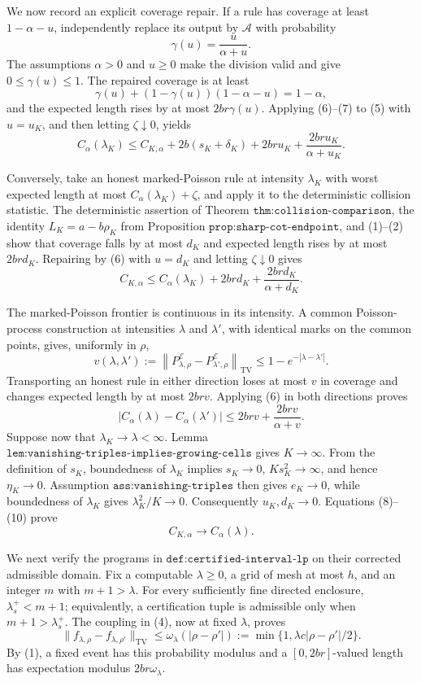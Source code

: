 We now record an explicit coverage repair.  If a rule has coverage at
least \(1-\alpha-u\), independently replace its output by
\(\mathcal A\) with probability
\[
 \gamma(u)=\frac{u}{\alpha+u}.
 \tag{6}
\]
The assumptions \(\alpha>0\) and \(u\ge0\) make the division valid and
give \(0\le\gamma(u)\le1\).  The repaired coverage is at least
\[
 \gamma(u)+(1-\gamma(u))(1-\alpha-u)=1-\alpha,
 \tag{7}
\]
and the expected length rises by at most \(2br\gamma(u)\).  Applying
(6)--(7) to (5) with \(u=u_K\), and then letting \(\zeta\downarrow0\),
yields
\[
 C_\alpha(\lambda_K)
 \le C_{K,\alpha}+2b(s_K+\delta_K)+2bru_K
 +\frac{2bru_K}{\alpha+u_K}.
 \tag{8}
\]

Conversely, take an honest marked-Poisson rule at intensity
\(\lambda_K\) with worst expected length at most
\(C_\alpha(\lambda_K)+\zeta\), and apply it to the deterministic
collision statistic.  The deterministic assertion of Theorem
\(\texttt{thm:collision-comparison}\), the identity
\(L_K=a-b\rho_K\) from Proposition
\(\texttt{prop:sharp-cot-endpoint}\), and (1)--(2) show that coverage
falls by at most \(d_K\) and expected length rises by at most
\(2brd_K\).  Repairing by (6) with \(u=d_K\) and letting
\(\zeta\downarrow0\) gives
\[
 C_{K,\alpha}
 \le C_\alpha(\lambda_K)+2brd_K
 +\frac{2brd_K}{\alpha+d_K}.
 \tag{9}
\]

The marked-Poisson frontier is continuous in its intensity.  A common
Poisson-process construction at intensities \(\lambda\) and
\(\lambda'\), with identical marks on the common points, gives,
uniformly in \(\rho\),
\[
 v(\lambda,\lambda')
 :=\left\lVert P^{\mathcal E}_{\lambda,\rho}
 -P^{\mathcal E}_{\lambda',\rho}\right\rVert_{\mathrm{TV}}
 \le1-e^{-|\lambda-\lambda'|}.
\]
Transporting an honest rule in either direction loses at most \(v\) in
coverage and changes expected length by at most \(2brv\).  Applying
(6) in both directions proves
\[
 |C_\alpha(\lambda)-C_\alpha(\lambda')|
 \le2brv+\frac{2brv}{\alpha+v}.
 \tag{10}
\]
Suppose now that \(\lambda_K\to\lambda<\infty\).  Lemma
\(\texttt{lem:vanishing-triples-implies-growing-cells}\) gives
\(K\to\infty\).  From the definition of \(s_K\), boundedness of
\(\lambda_K\) implies
\(s_K\to0\), \(Ks_K^2\to\infty\), and hence \(\eta_K\to0\).
Assumption \(\texttt{ass:vanishing-triples}\) then gives
\(e_K\to0\), while boundedness of \(\lambda_K\) gives
\(\lambda_K^2/K\to0\).  Consequently \(u_K,d_K\to0\).
Equations (8)--(10) prove
\[
 C_{K,\alpha}\longrightarrow C_\alpha(\lambda).
 \tag{11}
\]

We next verify the programs in
\(\texttt{def:certified-interval-lp}\) on their corrected admissible
domain.  Fix a computable \(\lambda\ge0\), a grid of mesh at most
\(h\), and an integer \(m\) with \(m+1>\lambda\).  For every
sufficiently fine directed enclosure,
\(\lambda_s^+<m+1\); equivalently, a certification tuple is admissible
only when \(m+1>\lambda_s^+\).  The coupling in (4), now at fixed
\(\lambda\), proves
\[
 \lVert f_{\lambda,\rho}-f_{\lambda,\rho'}\rVert_{\mathrm{TV}}
 \le
 \omega_\lambda(|\rho-\rho'|)
 :=\min\{1,\lambda c|\rho-\rho'|/2\}.
 \tag{12}
\]
By (1), a fixed event has this probability modulus and a
\([0,2br]\)-valued length has expectation modulus
\(2br\omega_\lambda\).

